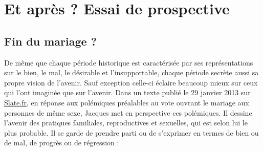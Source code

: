 

\part{Et après ? Essai de prospective}



 
 \chapter{Fin du mariage ?}

 De même que chaque période historique est caractérisée par ses représentations sur le bien, le mal, le désirable et l'insupportable, chaque période secrète aussi sa propre vision de l'avenir. Sauf exception celle-ci éclaire beaucoup mieux sur ceux qui l'ont imaginée que sur l'avenir. Dans un texte publié le 29 janvier 2013 sur \href{http://www.slate.fr}{Slate.fr}, en réponse aux polémiques préalables au vote ouvrant le mariage aux personnes de même sexe, Jacques  met en perspective ces polémiques. Il dessine l'avenir des pratiques familiales, reproductives et sexuelles, qui est selon lui le plus probable. Il se garde de prendre parti ou de s'exprimer en termes de bien ou de mal, de progrès ou de régression  : 

